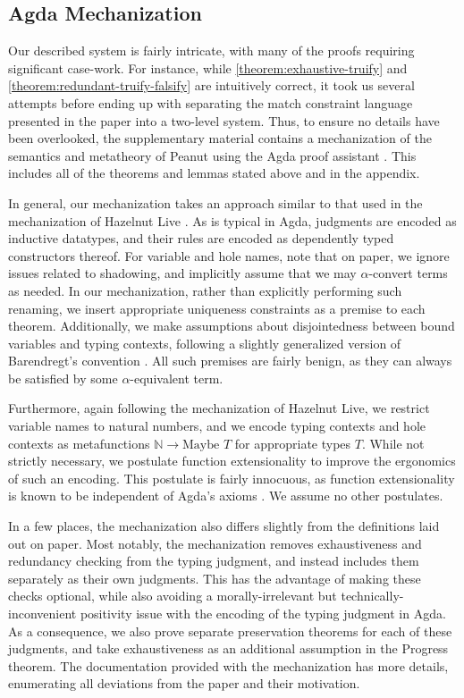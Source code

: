\subsection{Agda Mechanization}
\label{sec:agda}

Our described system is fairly intricate, with many of the proofs
requiring significant case-work.
%
For instance, while \autoref{theorem:exhaustive-truify} and
\autoref{theorem:redundant-truify-falsify} are intuitively correct, it
took us several attempts before ending up with separating the match
constraint language presented in the paper into a two-level system.
%
%
Thus, to ensure
no details have been overlooked, the supplementary material contains a
mechanization of the semantics and metatheory of Peanut using the Agda
proof assistant \cite{norell:thesis}. This includes all of the
theorems and lemmas stated above and in the appendix.

In general, our mechanization takes an approach similar to that used in the mechanization of Hazelnut Live \cite{DBLP:journals/pacmpl/OmarVCH19}. As is typical in Agda, judgments are encoded as inductive datatypes, and their rules are encoded as dependently typed constructors thereof. For variable and hole names, note that on paper, we ignore issues related to shadowing, and implicitly assume that we may $\alpha$-convert terms as needed. In our mechanization, rather than explicitly performing such renaming, we insert appropriate uniqueness constraints as a premise to each theorem. Additionally, we make assumptions about disjointedness between bound variables and typing contexts, following a slightly generalized version of Barendregt’s convention \cite{DBLP:books/daglib/0067558, DBLP:conf/cade/UrbanBN07}. All such premises are fairly benign, as they can always be satisfied by some $\alpha$-equivalent term.

Furthermore, again following the mechanization of Hazelnut Live, we restrict variable names to natural numbers, and we encode typing contexts and hole contexts as metafunctions $\mathbb{N} \to \text{Maybe } T$ for appropriate types $T$. While not strictly necessary, we postulate function extensionality to improve the ergonomics of such an encoding. This postulate is fairly innocuous, as function extensionality is known to be independent of Agda’s axioms \cite{DBLP:conf/lics/AwodeyGS12}. We assume no other postulates.

In a few places, the mechanization also differs slightly from the definitions laid out on paper. Most notably, the mechanization removes exhaustiveness and redundancy checking from the typing judgment, and instead includes them separately as their own judgments. This has the advantage of making these checks optional, while also avoiding a morally-irrelevant but technically-inconvenient positivity issue with the encoding of the typing judgment in Agda. As a consequence, we also prove separate preservation theorems for each of these judgments, and take exhaustiveness as an additional assumption in the Progress theorem. The documentation provided with the mechanization has more details, enumerating all deviations from the paper and their motivation.